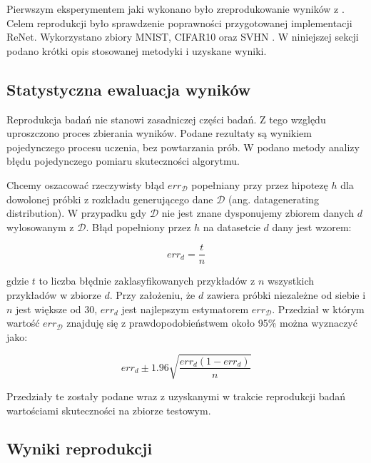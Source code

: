 \documentclass[oneside, mag]{mgr}
\begin{document}
Pierwszym eksperymentem jaki wykonano było zreprodukowanie wyników z \cite{DBLP:journals/corr/VisinKCMCB15}. Celem reprodukcji było sprawdzenie poprawności przygotowanej implementacji ReNet. Wykorzystano zbiory MNIST, CIFAR10 oraz SVHN \cite{svhn}. W niniejszej sekcji podano krótki opis stosowanej metodyki i uzyskane wyniki.

\subsection{Statystyczna ewaluacja wyników}

Reprodukcja badań nie stanowi zasadniczej części badań. Z tego względu uproszczono proces zbierania wyników. Podane rezultaty są wynikiem pojedynczego procesu uczenia, bez powtarzania prób. W \cite{tom-mitchell-machine-learning} podano metody analizy błędu pojedynczego pomiaru skuteczności algorytmu.

Chcemy oszacować rzeczywisty błąd $err_{\mathcal{D}}$ popełniany przy przez hipotezę $h$ dla dowolonej próbki z rozkładu generującego dane $\mathcal{D}$ (ang. datagenerating distribution). W przypadku gdy $\mathcal{D}$ nie jest znane dysponujemy zbiorem danych $d$ wylosowanym z $\mathcal{D}$. Błąd popełniony przez $h$ na datasetcie $d$ dany jest wzorem:

\begin{equation}
	err_d = \frac{t}{n}
\end{equation}

gdzie $t$ to liczba błędnie zaklasyfikowanych przykładów z $n$ wszystkich przykładów w zbiorze $d$.
Przy założeniu, że $d$ zawiera próbki niezależne od siebie i $n$ jest większe od 30, $err_d$ jest najlepszym estymatorem $err_{\mathcal{D}}$. Przedział w którym wartość $err_{\mathcal{D}}$ znajduję się z prawdopodobieństwem około 95\% można wyznaczyć jako:

\begin{equation}
	err_{d} \pm 1.96 \sqrt{\frac{err_{d}(1 - err_{d})}{n}} 
\end{equation}

Przedziały te zostały podane wraz z uzyskanymi w trakcie reprodukcji badań wartościami skuteczności na zbiorze testowym.

\subsection{Wyniki reprodukcji}
\end{document}
